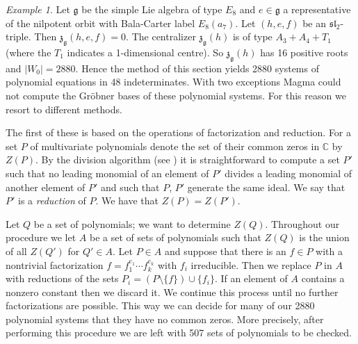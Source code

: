 \documentclass[a4paper,10pt]{amsart}
\newcommand{\C}{\mathbb{C}}
\newcommand{\mf}{\mathfrak}
\newcommand{\g}{\mf{g}}
\newcommand{\ssl}{\mf{sl}}
\newcommand{\z}{\mf{z}}
\numberwithin{equation}{section}
\theoremstyle{remark}
\theoremstyle{remark}
\newtheorem{example}[theorem]{Example}
\begin{document}
\begin{example}
Let $\g$ be the simple Lie algebra of type $E_8$ and $e\in \g$ a representative
of the nilpotent orbit with Bala-Carter label $E_8(a_7)$. Let $(h,e,f)$ be an
$\ssl_2$-triple. Then
$\z_\g(h,e,f)=0$. The centralizer $\z_\g(h)$ is of type $A_3+A_4+T_1$ (where
the $T_1$ indicates a 1-dimensional centre). So  $\z_\g(h)$ has 16 positive
roots and $|W_0|=2880$. Hence the method of this section yields 2880 systems of
polynomial equations in 48 indeterminates. With two exceptions {\sc Magma}
could not compute the Gr\"obner bases of these polynomial systems. For this
reason we resort to different methods.

The first of these is based on the operations of factorization and reduction.
For a set $P$ of multivariate polynomials denote the set of their common
zeros in $\C$ by $Z(P)$. By the division algorithm (see \cite[\S 2.3]{clo})
it is straightforward to compute a set $P'$ such that no leading monomial
of an element of $P'$ divides a leading monomial of another element of $P'$
and such that $P$, $P'$ generate the same ideal. We say that $P'$ is a
{\em reduction} of $P$. We have that $Z(P)=Z(P')$.

Let $Q$ be a set of polynomials; we want to determine $Z(Q)$. 
Throughout our procedure we let $A$ be a set of sets of polynomials such that
$Z(Q)$ is the union of all $Z(Q')$ for $Q'\in A$. Let $P\in A$ and suppose
that there is an $f\in P$ with a nontrivial factorization $f=f_1^{e_1}\cdots
f_k^{e_k}$ with $f_i$ irreducible. Then we replace $P$ in $A$ with reductions
of the sets $P_i = (P\setminus \{f\})\cup \{f_i\}$. If an element of $A$
contains a nonzero constant then we discard it. We continue this process until
no further factorizations are possible. This way we can decide for many of our
2880 polynomial systems that they have no common zeros. More precisely,
after performing this procedure we are left with 507 sets of polynomials
to be checked. 


\end{example}
\end{document}
